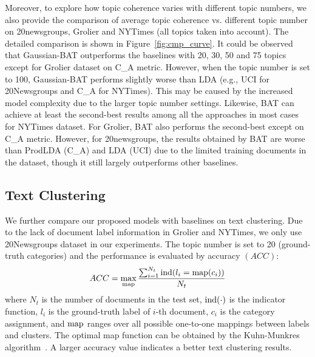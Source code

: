 \documentclass[11pt,a4paper]{article}
\begin{document}
{\color{black}Moreover, to explore how topic coherence varies with different topic numbers,} we also provide the comparison of average topic coherence vs. different topic number on 20newsgroups, Grolier and NYTimes (all topics taken into account). The detailed comparison is shown in Figure~\ref{fig:cmp_curve}. {\color{black}It could be observed that Gaussian-BAT outperforms the baselines with 20, 30, 50 and 75 topics except for Grolier dataset on C\_A metric. However, when the topic number is set to 100, Gaussian-BAT performs slightly worse than LDA (e.g., UCI for 20Newsgroups and C\_A for NYTimes). This may be caused by the increased model complexity due to the larger topic number settings. Likewise, BAT can achieve at least the second-best results among all the approaches in most cases for NYTimes dataset. For Grolier, BAT also performs the second-best except on C\_A metric.   However, for 20newsgroups, the results obtained by BAT are worse than ProdLDA (C\_A) and LDA (UCI) due to the limited training documents in the dataset, though it still largely outperforms other baselines.} 

\subsection{Text Clustering}

We further compare our proposed models with baselines on text clustering. 
Due to the lack of document label information in Grolier and NYTimes, we only use 20Newsgroups dataset in our experiments. The topic number is set to 20 (ground-truth categories) and the performance is evaluated by accuracy $(ACC)$:
\begin{equation}
ACC=\max_{\rm map} \frac{\sum_{i=1}^{N_{t}}{\rm ind}(l_{i}={\rm map}(c_{i}))}{N_{t}}
\end{equation}
where $N_{t}$ is the number of documents in the test set, ${\rm ind(\cdot)}$ is the indicator function, $l_{i}$ is the ground-truth label of $i$-th document, $c_{i}$ is the category assignment, {\color{black}and ${\rm map}$ ranges over all possible one-to-one mappings between labels and clusters}. {\color{black} The optimal map function can be obtained by the Kuhn-Munkres algorithm~\cite{kuhn1955hungarian}. A larger accuracy value indicates a better text clustering results. }
\begin{table}[h]
\centering
\small
{}
\caption{Text clustering accuracy on 20Newsgroups (20NG). `G-BAT' refers to `Gaussian-BAT'. The best result is highlighted in bold.}
\label{tbs:unsupervised_classification}
\end{table}  
\end{document}
